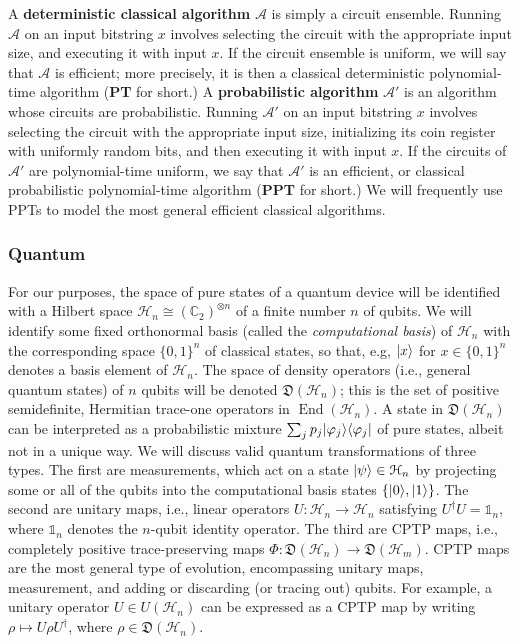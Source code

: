 \documentclass[11pt]{article}
\numberwithin{equation}{section}
\newcommand{\one}{\mathds 1}
\DeclareMathOperator{\End}{End}
\newcommand{\C}{\mathbb{C}}
\newcommand{\algo}{\mathcal}
\newcommand{\states}{\mathfrak D}
\begin{document}
{A \textbf{deterministic classical algorithm} $\algo A$ is simply a circuit ensemble. Running $\algo A$ on an input bitstring $x$ involves selecting the circuit with the appropriate input size, and executing it with input $x$. If the circuit ensemble is uniform, we will say that $\algo A$ is efficient; more precisely, it is then a classical deterministic polynomial-time algorithm (\textbf{PT} for short.) A \textbf{probabilistic algorithm} $\algo A'$ is an algorithm whose circuits are probabilistic. Running $\algo A'$ on an input bitstring $x$ involves selecting the circuit with the appropriate input size, initializing its coin register with uniformly random bits, and then executing it with input $x$. If the circuits of $\algo A'$ are polynomial-time uniform, we say that $\algo A'$ is an efficient, or classical probabilistic polynomial-time algorithm (\textbf{PPT} for short.) We will frequently use PPTs to model the most general efficient classical algorithms.

\subsubsection{Quantum}

For our purposes, the space of pure states of a quantum device will be identified with a Hilbert space $\mathcal H_n \cong (\C_2)^{\otimes n}$ of a finite number $n$ of qubits. We will identify some fixed orthonormal basis (called the \emph{computational basis}) of $\mathcal H_n$ with the corresponding space $\{0, 1\}^n$ of classical states, so that, e.g, ${\left\vert{x}\right\rangle}$ for $x \in \{0, 1\}^n$ denotes a basis element of $\mathcal H_n$. The space of density operators (i.e., general quantum states) of $n$ qubits will be denoted $\states (\mathcal H_n)$; this is the set of positive semidefinite, Hermitian trace-one operators in $\End(\mathcal H_n)$. A state in $\states (\mathcal H_n)$ can be interpreted as a probabilistic mixture $\sum_j p_j {\left\vert{\varphi_j}\right\rangle}{\left\langle{\varphi_j}\right\vert}$ of pure states, albeit not in a unique way. We will discuss valid quantum transformations of three types. The first are measurements, which act on a state ${\left\vert{\psi}\right\rangle} \in \mathcal H_n$ by projecting some or all of the qubits into the computational basis states $\{{\left\vert{0}\right\rangle}, {\left\vert{1}\right\rangle}\}$. The second are unitary maps, i.e., linear operators $U: \mathcal H_n \rightarrow \mathcal H_n$ satisfying $U^\dagger U = \one_n$, where $\one_n$ denotes the $n$-qubit identity operator. The third are CPTP maps, i.e., completely positive trace-preserving maps $\Phi : \states (\mathcal H_n) \rightarrow \states (\mathcal H_m)$. CPTP maps are the most general type of evolution, encompassing unitary maps, measurement, and adding or discarding (or tracing out) qubits. For example, a unitary operator $U \in U(\mathcal H_n)$ can be expressed as a CPTP map by writing $\rho \mapsto U\rho U^\dagger$, where $\rho \in \states (\mathcal H_n)$.

}
\end{document}
